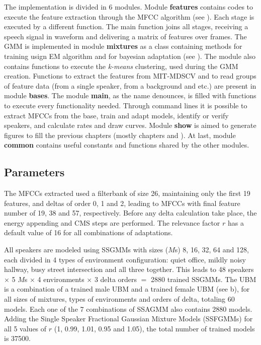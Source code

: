 The implementation is divided in 6 modules. Module \textbf{features} contains codes to execute the feature extraction through the MFCC algorithm (see ). Each stage is executed by a different function. The main function joins all stages, receiving a speech signal in waveform and delivering a matrix of features over frames. The GMM is implemented in module \textbf{mixtures} as a class containing methods for training usign EM algorithm and for bayesian adaptation (see ). The module also contains functions to execute the \emph{k-means} clustering, used during the GMM creation. Functions to extract the features from MIT-MDSCV and to read groups of feature data (from a single speaker, from a background and etc.) are present in module \textbf{bases}. The module \textbf{main}, as the name denounces, is filled with functions to execute every functionality needed. Through command lines it is possible to extract MFCCs from the base, train and adapt models, identify or verify speakers, and calculate rates and draw curves. Module \textbf{show} is aimed to generate figures to fill the previous chapters (mostly chapters  and ). At last, module \textbf{common} contains useful constants and functions shared by the other modules.

\subsection{Parameters}

The MFCCs extracted used a filterbank of size 26, maintaining only the first 19 features, and deltas of order 0, 1 and 2, leading to MFCCs with final feature number of 19, 38 and 57, respectively. Before any delta calculation take place, the energy appending and CMS steps are performed. The relevance factor $r$ has a default value of 16 for all combinations of adaptations.

All speakers are modeled using SSGMMs with sizes ($M$s) 8, 16, 32, 64 and 128, each divided in 4 types of environment configuration: quiet office, mildly noisy hallway, busy street intersection and all three together. This leads to 48 speakers $\times$ 5 $M$s $\times$ 4 environments $\times$ 3 delta orders $=$ 2880 trained SSGMMs. The UBM is a combination of a trained male UBM and a trained female UBM (see b), for all sizes of mixtures, types of environments and orders of delta, totaling 60 models. Each one of the 7 combinations of SSAGMM also contains 2880 models. Adding the Single Speaker Fractional Gaussian Mixture Models (SSFGMMs) for all 5 values of $r$ (1, 0.99, 1.01, 0.95 and 1.05), the total number of trained models is 37500.

